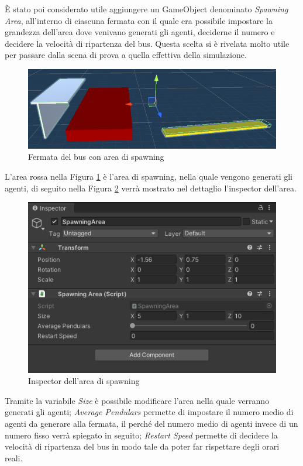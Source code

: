 \documentclass[12pt, openany]{book}
\begin{document}
	 È stato poi considerato utile aggiungere un GameObject denominato \emph{Spawning Area}, all'interno di ciascuna fermata con il quale era possibile impostare la grandezza dell'area dove venivano generati gli agenti, deciderne il numero e decidere la velocità di ripartenza del bus. Questa scelta si è rivelata molto utile per passare dalla scena di prova a quella effettiva della simulazione.
	 \begin{figure}[H]
	 	\centering
	 	\includegraphics[width=1\linewidth]{"Immagini/BusStopSA.png"}
	 	\caption{Fermata del bus con area di spawning}
	 	\label{fig:BusStopSA}
	 \end{figure}
 	L'area rossa nella Figura \ref{fig:BusStopSA} è l'area di spawning, nella quale vengono generati gli agenti, di seguito nella Figura \ref{fig:SAInspector} verrà mostrato nel dettaglio l'inspector dell'area.
 	\begin{figure}[H]
 		\centering
 		\includegraphics[width=1\linewidth]{"Immagini/SAInspector.png"}
 		\caption{Inspector dell'area di spawning}
 		\label{fig:SAInspector}
 	\end{figure}
 	Tramite la variabile \emph{Size} è possibile modificare l'area nella quale verranno generati gli agenti; \emph{Average Pendulars} permette di impostare il numero medio di agenti da generare alla fermata, il perché del numero medio di agenti invece di un numero fisso verrà spiegato in seguito; \emph{Restart Speed} permette di decidere la velocità di ripartenza del bus in modo tale da poter far rispettare degli orari reali.  
\end{document}
